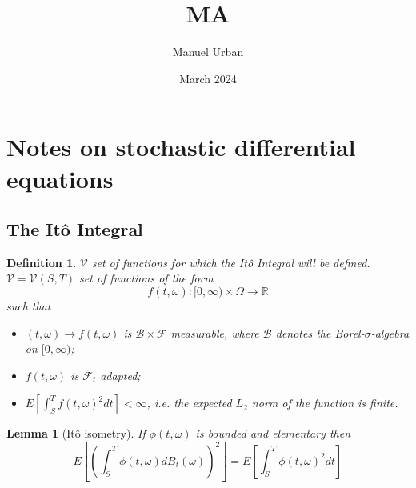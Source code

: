 \documentclass{article}
\title{MA}
\author{Manuel Urban}
\date{March 2024}
\newtheorem{definition}{Definition}
\newtheorem{lemma}{Lemma}
\begin{document}
\maketitle

\section{Notes on stochastic differential equations}

\subsection{The Itô Integral}

\begin{definition}

 $\mathcal{V}$ set of functions for which the Itô Integral will be defined. \\
 $\mathcal{V} = \mathcal{V}(S,T)$ set of functions of the form
\begin{equation}
    f(t,\omega): [0, \infty) \times \Omega \to \mathbb{R}
\end{equation}
such that
\begin{itemize}
    \item 
        $(t,\omega) \to  f(t,\omega)$ is $\mathcal{B} \times \mathcal{F}$ measurable, where $\mathcal{B}$ denotes the Borel-$\sigma$-algebra on $[0,\infty)$;
    \item
        $f(t,\omega)$ is $\mathcal{F}_t$ adapted;
    \item
        $E\left[ \int^T_S f(t,\omega)^2dt\right] < \infty$, i.e. the expected $L_2$ norm of the function is finite.
\end{itemize}

\end{definition}

\begin{lemma}[Itô isometry]
    If $\phi(t,\omega)$ is bounded and elementary then
    \begin{equation}
        E \left[ \left( \int_S^T \phi(t,\omega)dB_t(\omega) \right)^2 \right]
        =
        E\left[ \int_S^T \phi(t,\omega)^2dt \right]
    \end{equation}
\end{lemma}
\end{document}
